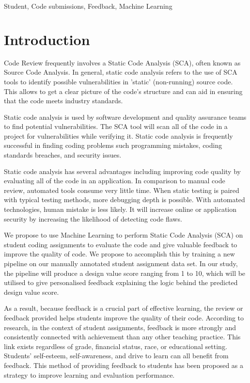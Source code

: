 \documentclass[conference]{IEEEtran}
\begin{document}
\begin{IEEEkeywords}
Student, Code submissions, Feedback, Machine Learning
\end{IEEEkeywords}

\section{Introduction}
Code Review frequently involves a Static Code Analysis (SCA), often known as
Source Code Analysis. In general, static code analysis refers to the use of SCA
tools to identify possible vulnerabilities in ’static’ (non-running) source code. This
allows to get a clear picture of the code’s structure and can aid in ensuring that the
code meets industry standards.

Static code analysis is used by software development and quality assurance teams
to find potential vulnerabilities. The SCA tool will scan all of the code in a
project for vulnerabilities while verifying it. Static code analysis is frequently
successful in finding coding problems such programming mistakes, coding
standards breaches, and security issues.

Static code analysis has several advantages including improving code quality by
evaluating all of the code in an application. In comparison to manual code review,
automated tools consume very little time. When static testing is paired with typical
testing methods, more debugging depth is possible. With automated technologies,
human mistake is less likely. It will increase online or application security by
increasing the likelihood of detecting code flaws.

We propose to use Machine Learning to perform Static Code Analysis (SCA) on
student coding assignments to evaluate the code and give valuable feedback to improve the quality of code. We propose to accomplish this by training a new
pipeline on our manually annotated student assignment data set. In our study, the
pipeline will produce a design value score ranging from 1 to 10, which will be
utilised to give personalised feedback explaining the logic behind the predicted
design value score.

As a result, because feedback is a crucial part of effective learning, the review or
feedback provided helps students improve the quality of their code. According to
research, in the context of student assignments, feedback is more strongly and
consistently connected with achievement than any other teaching practice. This
link exists regardless of grade, financial status, race, or educational setting.
Students’ self-esteem, self-awareness, and drive to learn can all benefit from
feedback. This method of providing feedback to students has been proposed as a
strategy to improve learning and evaluation performance.
\end{document}
